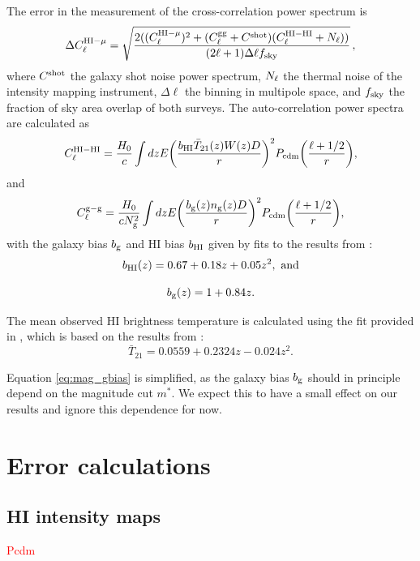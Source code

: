 \documentclass[useAMS,usenatbib]{mnras}
\newcommand{\be}{\begin{equation}}
\newcommand{\ee}{\end{equation}}
\newcommand{\ama}[1]{\textcolor{red}{{#1}}}
\begin{document}
The error in the measurement of the cross-correlation power spectrum is
\be
\label{eq:magerr}
\Delta C^{{\rm HI} - \mu}_\ell = \sqrt{\frac{2((C^{{\rm HI} - \mu}_\ell)^2+(C^{\rm gg}_\ell+C^{\rm shot})(C^{\rm HI-HI}_\ell+N_\ell))}{(2\ell+1)\Delta \ell f_{\rm sky}}} \, ,
\ee where $C^{\rm shot}$ the galaxy shot noise power spectrum, $N_{\rm \ell}$ the thermal noise of the intensity mapping instrument, $\Delta \ell$ the binning in multipole space, and $f_{\rm sky}$ the fraction of sky area overlap of both surveys. The auto-correlation power spectra are calculated as
\begin{equation}
C_\ell^{\rm HI-HI} = \frac{H_0}{c} \int dz E \biggl( \frac{ b_{\rm HI}\bar{T}_{21}(z) W(z) D}{r}\biggr)^2 P_{\rm cdm} \biggl( \frac{\ell + 1/2}{r} \biggr),
\end{equation}
and
\begin{equation}
  \label{eq:clgal}
C_\ell^{{\rm g-g}} = \frac{H_0}{cN_{\rm g}^2} \int dz E \biggl( \frac{ b_{\rm g }(z) n_{\rm g}(z) D}{r}\biggr)^2 P_{\rm cdm} \biggl( \frac{\ell + 1/2}{r} \biggr),
\end{equation}
with the galaxy bias $b_{\rm g}$ and HI bias $b_{\rm HI}$ given by fits to the results from \cite{0004-637X-814-2-145}:
\begin{equation}
  b_{\rm HI}(z) = 0.67 + 0.18 z + 0.05 z^2,{\rm~and}
\end{equation}

\begin{equation}
  b_{\rm g}(z) = 1+0.84 z.
  \label{eq:mag_gbias}
\end{equation}

The mean observed HI brightness temperature is calculated using the fit provided in \cite{2017arXiv170906099S}, which is based on the results from \cite{2015aska.confE..19S}:
\be
\bar{T}_{21} = 0.0559+0.2324z-0.024 z^2.
\ee


Equation \ref{eq:mag_gbias} is simplified, as the galaxy bias $b_{\rm g}$ should in principle depend on the magnitude cut $m^*$. We expect this to have a small effect on our results and ignore this dependence for now.

\section{Error calculations}

\subsection{HI intensity maps}
\ama{Pcdm}
\end{document}
